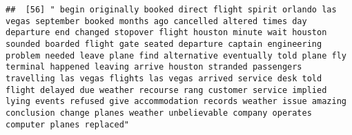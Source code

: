 \documentclass[
]{article}
\begin{document}
\begin{verbatim}
##  [56] " begin originally booked direct flight spirit orlando las vegas september booked months ago cancelled altered times day departure end changed stopover flight houston minute wait houston sounded boarded flight gate seated departure captain engineering problem needed leave plane find alternative eventually told plane fly terminal happened leaving arrive houston stranded passengers travelling las vegas flights las vegas arrived service desk told flight delayed due weather recourse rang customer service implied lying events refused give accommodation records weather issue amazing conclusion change planes weather unbelievable company operates computer planes replaced"                                                                                                                                                                                                                                                                                                                                                                                                                                                                                                                                                                                                                                                                                                                                                                                                                                                                                                                                                                                                                                                                                                

\end{verbatim}
\end{document}
